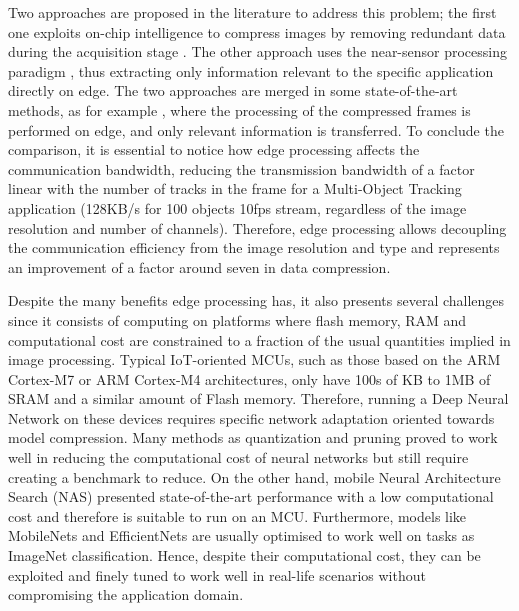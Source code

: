 Two approaches are proposed in the literature to address this problem; the first one exploits on-chip intelligence to compress images by removing redundant data during the acquisition stage \cite{7456200, RGB-PIXEL?, 6032080}. The other approach uses the near-sensor processing paradigm \cite{336244}, thus extracting only information relevant to the specific application directly on edge.
The two approaches are merged in some state-of-the-art methods, as for example \cite{paissan2021enabling, 8791337, 10.1145/3203217.3204463}, where the processing of the compressed frames is performed on edge, and only relevant information is transferred.
To conclude the comparison, it is essential to notice how edge processing affects the communication bandwidth, reducing the transmission bandwidth of a factor linear with the number of tracks in the frame for a Multi-Object Tracking application (128KB/s for 100 objects 10fps stream, regardless of the image resolution and number of channels). Therefore, edge processing allows decoupling the communication efficiency from the image resolution and type and represents an improvement of a factor around seven in data compression.

Despite the many benefits edge processing has, it also presents several challenges since it consists of computing on platforms where flash memory, RAM and computational cost are constrained to a fraction of the usual quantities implied in image processing. Typical IoT-oriented MCUs, such as those based on the ARM Cortex-M7 or ARM Cortex-M4 architectures, only have 100s of KB to 1MB of SRAM and a similar amount of Flash memory. Therefore, running a Deep Neural Network on these devices requires specific network adaptation oriented towards model compression. Many methods as quantization \cite{zhou2017incremental, jacob2018quantization} and pruning proved to work well in reducing the computational cost of neural networks but still require creating a benchmark to reduce.
On the other hand, mobile Neural Architecture Search (NAS) \cite{howard2017mobilenets, sandler2018mobilenetv2, tan2019efficientnet} presented state-of-the-art performance with a low computational cost and therefore is suitable to run on an MCU. Furthermore, models like MobileNets \cite{howard2017mobilenets, sandler2018mobilenetv2} and EfficientNets \cite{tan2019efficientnet, tan2021efficientnetv2} are usually optimised to work well on tasks as ImageNet classification. Hence, despite their computational cost, they can be exploited and finely tuned to work well in real-life scenarios without compromising the application domain.

